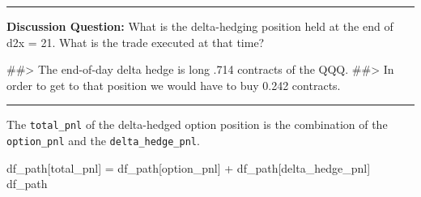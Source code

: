 \documentclass[
  letterpaper,
  DIV=11,
  numbers=noendperiod]{scrreprt}
\newenvironment{Shaded}{\begin{snugshade}}{\end{snugshade}}
\newcommand{\CommentTok}[1]{\textcolor[rgb]{0.37,0.37,0.37}{#1}}
\newcommand{\NormalTok}[1]{\textcolor[rgb]{0.00,0.23,0.31}{#1}}
\newcommand{\OperatorTok}[1]{\textcolor[rgb]{0.37,0.37,0.37}{#1}}
\newcommand{\StringTok}[1]{\textcolor[rgb]{0.13,0.47,0.30}{#1}}
\begin{document}
\begin{center}\rule{0.5\linewidth}{0.5pt}\end{center}

\textbf{Discussion Question:} What is the delta-hedging position held at
the end of d2x = 21. What is the trade executed at that time?

\begin{Shaded}
\begin{Highlighting}[]
\CommentTok{\#\#\textgreater{} The end{-}of{-}day delta hedge is long .714 contracts of the QQQ.  }
\CommentTok{\#\#\textgreater{} In order to get to that position we would have to buy 0.242 contracts. }
\end{Highlighting}
\end{Shaded}

\begin{center}\rule{0.5\linewidth}{0.5pt}\end{center}

The \texttt{total\_pnl} of the delta-hedged option position is the
combination of the \texttt{option\_pnl} and the
\texttt{delta\_hedge\_pnl}.

\begin{Shaded}
\begin{Highlighting}[]
\NormalTok{df\_path[}\StringTok{\textquotesingle{}total\_pnl\textquotesingle{}}\NormalTok{] }\OperatorTok{=}\NormalTok{ df\_path[}\StringTok{\textquotesingle{}option\_pnl\textquotesingle{}}\NormalTok{] }\OperatorTok{+}\NormalTok{ df\_path[}\StringTok{\textquotesingle{}delta\_hedge\_pnl\textquotesingle{}}\NormalTok{]}
\NormalTok{df\_path}
\end{Highlighting}
\end{Shaded}
\end{document}
